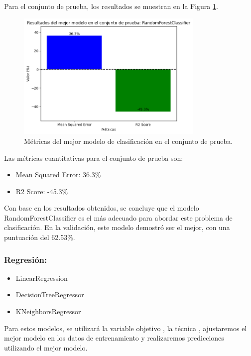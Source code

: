 Para el conjunto de prueba, los resultados se muestran en la Figura \ref{fig:metricas_clasificacion_bestModel}.

\begin{figure}[H]
\centering
\includegraphics[width=0.8\textwidth]{img/compara_algoritmos/metricasBestModelRandomForesClassifier.png}
\caption{Métricas del mejor modelo de clasificación en el conjunto de prueba.}
\label{fig:metricas_clasificacion_bestModel}
\end{figure}

Las métricas cuantitativas para el conjunto de prueba son:

\begin{itemize}
\item Mean Squared Error: 36.3\%
\item R2 Score: -45.3\%
\end{itemize}

Con base en los resultados obtenidos, se concluye que el modelo RandomForestClassifier es el más adecuado para abordar este problema de clasificación. En la validación, este modelo demostró ser el mejor, con una puntuación del 62.53\%.


\subsubsection*{Regresión:}

\begin{itemize}
    \item LinearRegression
    \item DecisionTreeRegressor
    \item KNeighborsRegressor
\end{itemize}

Para estos modelos, se utilizará la variable objetivo , la técnica , ajustaremos el mejor modelo en los datos de entrenamiento y realizaremos predicciones utilizando el mejor modelo.

